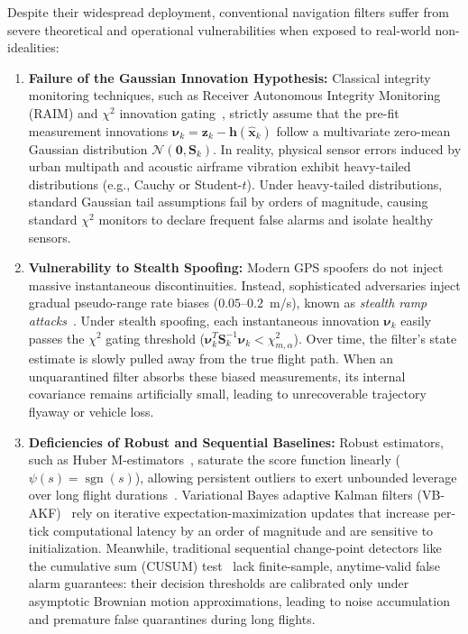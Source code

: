 \documentclass[journal,twocolumn]{IEEEtran}
\begin{document}
Despite their widespread deployment, conventional navigation filters suffer from severe theoretical and operational vulnerabilities when exposed to real-world non-idealities:
\begin{enumerate}
    \item \textbf{Failure of the Gaussian Innovation Hypothesis:} Classical integrity monitoring techniques, such as Receiver Autonomous Integrity Monitoring (RAIM) and $\chi^2$ innovation gating~\cite{barshalom2001estimation,blanch2012baseline}, strictly assume that the pre-fit measurement innovations $\bm{\nu}_k = \mathbf{z}_k - \mathbf{h}(\hat{\mathbf{x}}_k)$ follow a multivariate zero-mean Gaussian distribution $\mathcal{N}(\mathbf{0}, \mathbf{S}_k)$. In reality, physical sensor errors induced by urban multipath and acoustic airframe vibration exhibit heavy-tailed distributions (e.g., Cauchy or Student-$t$). Under heavy-tailed distributions, standard Gaussian tail assumptions fail by orders of magnitude, causing standard $\chi^2$ monitors to declare frequent false alarms and isolate healthy sensors.
    \item \textbf{Vulnerability to Stealth Spoofing:} Modern GPS spoofers do not inject massive instantaneous discontinuities. Instead, sophisticated adversaries inject gradual pseudo-range rate biases ($0.05$--$0.2$~m/s), known as \emph{stealth ramp attacks}~\cite{psiaki2016gnss,humphreys2008assessing}. Under stealth spoofing, each instantaneous innovation $\bm{\nu}_k$ easily passes the $\chi^2$ gating threshold ($\bm{\nu}_k^T \mathbf{S}_k^{-1} \bm{\nu}_k < \chi^2_{m,\alpha}$). Over time, the filter's state estimate is slowly pulled away from the true flight path. When an unquarantined filter absorbs these biased measurements, its internal covariance remains artificially small, leading to unrecoverable trajectory flyaway or vehicle loss.
    \item \textbf{Deficiencies of Robust and Sequential Baselines:} Robust estimators, such as Huber M-estimators~\cite{chang2014robust,huber1964robust}, saturate the score function linearly ($\psi(s) = \operatorname{sgn}(s)$), allowing persistent outliers to exert unbounded leverage over long flight durations~\cite{hampel1974influence}. Variational Bayes adaptive Kalman filters (VB-AKF)~\cite{huang2017variational,lindsten2015backward} rely on iterative expectation-maximization updates that increase per-tick computational latency by an order of magnitude and are sensitive to initialization. Meanwhile, traditional sequential change-point detectors like the cumulative sum (CUSUM) test~\cite{basseville1993detection} lack finite-sample, anytime-valid false alarm guarantees: their decision thresholds are calibrated only under asymptotic Brownian motion approximations, leading to noise accumulation and premature false quarantines during long flights.
\end{enumerate}
\end{document}
